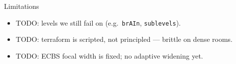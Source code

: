\begin{frame}{Limitations}
  \begin{itemize}
    \item TODO: levels we still fail on (e.g.\ \texttt{brAIn}, \texttt{sublevels}).
    \item TODO: terraform is scripted, not principled — brittle on dense rooms.
    \item TODO: ECBS focal width is fixed; no adaptive widening yet.
  \end{itemize}
\end{frame}
